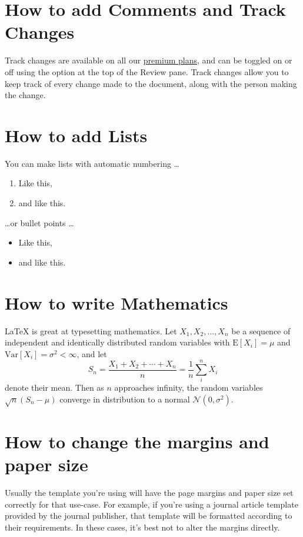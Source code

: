 \documentclass[a4paper,12pt]{scrreprt}
\begin{document}
\section{How to add Comments and Track Changes}

Track changes are available on all our \href{https://www.overleaf.com/user/subscription/plans}{premium plans}, and can be toggled on or off using the option at the top of the Review pane. Track changes allow you to keep track of every change made to the document, along with the person making the change. 

\section{How to add Lists}

You can make lists with automatic numbering \dots

\begin{enumerate}
\item Like this,
\item and like this.
\end{enumerate}
\dots or bullet points \dots
\begin{itemize}
\item Like this,
\item and like this.
\end{itemize}

\section{How to write Mathematics}

\LaTeX{} is great at typesetting mathematics. Let $X_1, X_2, \ldots, X_n$ be a sequence of independent and identically distributed random variables with $\text{E}[X_i] = \mu$ and $\text{Var}[X_i] = \sigma^2 < \infty$, and let
\[S_n = \frac{X_1 + X_2 + \cdots + X_n}{n}
      = \frac{1}{n}\sum_{i}^{n} X_i\]
denote their mean. Then as $n$ approaches infinity, the random variables $\sqrt{n}(S_n - \mu)$ converge in distribution to a normal $\mathcal{N}(0, \sigma^2)$.


\section{How to change the margins and paper size}

Usually the template you're using will have the page margins and paper size set correctly for that use-case. For example, if you're using a journal article template provided by the journal publisher, that template will be formatted according to their requirements. In these cases, it's best not to alter the margins directly.
\end{document}
